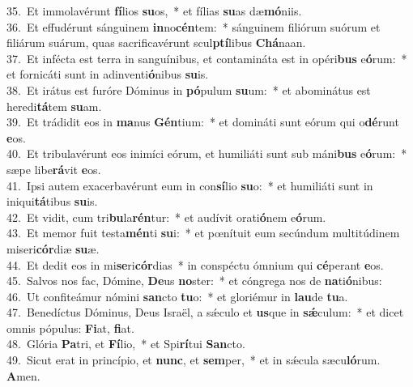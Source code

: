 {35.~}Et immolavérunt \textbf{fí}lios \textbf{su}os,~* et fílias \textbf{su}as dæ\textbf{mó}niis.\\
{36.~}Et effudérunt sánguinem \textbf{in}no\textbf{cén}tem:~* sánguinem filiórum suórum et filiárum suárum, quas sacrificavérunt scul\textbf{ptí}libus \textbf{Chá}naan.\\
{37.~}Et infécta est terra in sanguínibus, et contamináta est in opéri\textbf{bus} e\textbf{ó}rum:~* et fornicáti sunt in adinventi\textbf{ó}nibus \textbf{su}is.\\
{38.~}Et irátus est furóre Dóminus in \textbf{pó}pulum \textbf{su}um:~* et abominátus est heredi\textbf{tá}tem \textbf{su}am.\\
{39.~}Et trádidit eos in \textbf{ma}nus \textbf{Gén}tium:~* et domináti sunt eórum qui o\textbf{dé}runt \textbf{e}os.\\
{40.~}Et tribulavérunt eos inimíci eórum, et humiliáti sunt sub máni\textbf{bus} e\textbf{ó}rum:~* sæpe libe\textbf{rá}vit \textbf{e}os.\\
{41.~}Ipsi autem exacerbavérunt eum in con\textbf{sí}lio \textbf{su}o:~* et humiliáti sunt in iniqui\textbf{tá}tibus \textbf{su}is.\\
{42.~}Et vidit, cum tri\textbf{bu}la\textbf{rén}tur:~* et audívit orati\textbf{ó}nem e\textbf{ó}rum.\\
{43.~}Et memor fuit testa\textbf{mén}ti \textbf{su}i:~* et pœnítuit eum secúndum multitúdinem miseri\textbf{cór}diæ \textbf{su}æ.\\
{44.~}Et dedit eos in mi\textbf{se}ri\textbf{cór}dias~* in conspéctu ómnium qui \textbf{cé}perant \textbf{e}os.\\
{45.~}Salvos nos fac, Dómine, \textbf{De}us \textbf{no}ster:~* et cóngrega nos de \textbf{na}ti\textbf{ó}nibus:\\
{46.~}Ut confiteámur nómini \textbf{san}cto \textbf{tu}o:~* et gloriémur in \textbf{lau}de \textbf{tu}a.\\
{47.~}Benedíctus Dóminus, Deus Israël, a sǽculo et \textbf{us}que in \textbf{sǽ}culum:~* et dicet omnis pópulus: \textbf{Fi}at, \textbf{fi}at.\\
{48.~}Glória \textbf{Pa}tri, et \textbf{Fí}lio,~* et Spi\textbf{rí}tui \textbf{San}cto.\\
{49.~}Sicut erat in princípio, et \textbf{nunc}, et \textbf{sem}per,~* et in sǽcula sæcu\textbf{ló}rum. \textbf{A}men.\\
